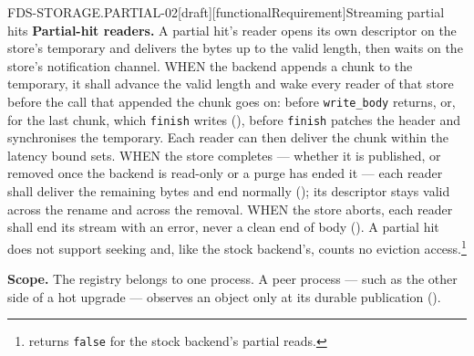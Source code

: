 \begin{requirement}{FDS-STORAGE.PARTIAL-02}[draft][functionalRequirement]{Streaming partial hits}
  \textbf{Partial-hit readers.} A partial hit's reader opens its own
  descriptor on the store's temporary and delivers the bytes up to the valid
  length, then waits on the store's notification channel. WHEN the backend
  appends a chunk to the temporary, it shall advance the valid length and
  wake every reader of that store before the call that appended the chunk
  goes on: before \texttt{write\_body} returns, or, for the last chunk, which
  \texttt{finish} writes (), before
  \texttt{finish} patches the header and synchronises the temporary. Each
  reader can then deliver the chunk within the latency bound
   sets. WHEN the store completes ---
  whether it is published, or removed once the backend is read-only or a
  purge has ended it --- each
  reader shall
  deliver the remaining bytes and end normally
  (); its descriptor stays valid across the
  rename and across the removal. WHEN the store aborts, each reader shall end
  its stream with an error, never a clean end of body
  (). A partial hit does not support
  seeking and, like the stock backend's, counts no eviction
  access.\footnote{
  returns \texttt{false} for the stock backend's partial reads.}

  \textbf{Scope.} The registry belongs to one process. A peer process ---
  such as the other side of a hot upgrade --- observes an object only at its
  durable publication ().



\end{requirement}

